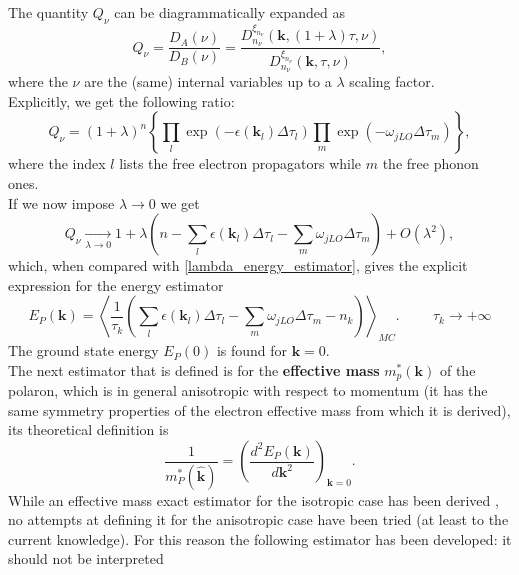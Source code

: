 The quantity $Q_\nu$ can be diagrammatically expanded as
\begin{equation}
    Q_\nu=\frac{D_A(\nu)}{D_B(\nu)}=\frac{D_{n_\nu}^{\xi_{n_\nu}}(\mathbf{k},(1+\lambda)\tau,\nu)}{D_{n_\nu}^{\xi_{n_\nu}}(\mathbf{k},\tau,\nu)},
\end{equation}
where the $\nu$ are the (same) internal variables up to a $\lambda$ scaling factor.\\
Explicitly, we get the following ratio:
\begin{equation}
    Q_\nu=(1+\lambda)^n\left\{\prod_{l}\exp{\left(-\epsilon(\mathbf{k}_l)\Delta\tau_l\right)}\prod_{m}\exp{\left(-\omega_{jLO}\Delta\tau_m\right)}\right\},
    \label{decomposition_estimator_energy}
\end{equation}
where the index $l$ lists the free electron propagators while $m$ the free phonon ones.\\
If we now impose $\lambda\to 0$ we get
\begin{equation}
    Q_\nu \xrightarrow[\lambda\to 0]{}1+\lambda\left(n-\sum_l\epsilon(\mathbf{k}_l)\Delta\tau_l-\sum_m\omega_{jLO}\Delta\tau_m\right)+O(\lambda^2),
\end{equation}
which, when compared with \ref{lambda_energy_estimator}, gives the explicit expression for the energy estimator
\begin{equation}
    E_P(\mathbf{k})=\left\langle \frac{1}{\tau_k} \left(\sum_l\epsilon(\mathbf{k}_l)\Delta\tau_l-\sum_m\omega_{jLO}\Delta\tau_m-n_k\right) \right\rangle_{MC}.\hspace{1cm}\tau_k\to+\infty
    \label{energy_estimator_MC}
\end{equation}
The ground state energy $E_P(0)$ is found for $\mathbf{k}=0$.\\
The next estimator that is defined is for the \textbf{effective mass} $m^*_p(\mathbf{k})$ of the polaron, which is in general anisotropic with respect to momentum (it 
has the same symmetry properties of the electron effective mass from which it is derived), its theoretical definition is
\begin{equation}
    \frac{1}{m^*_P(\hat{\mathbf{k}})}=\left(\frac{d^2 E_P(\mathbf{k})}{d{\mathbf{k}^2}}\right)_{\mathbf{k}=0}.
\end{equation}
While an effective mass exact estimator for the isotropic case has been derived \cite{mishchenko2000diagrammatic}, no attempts at defining it for the anisotropic 
case have been tried (at least to the current knowledge). For this reason the following estimator has been developed: it should not be interpreted 

